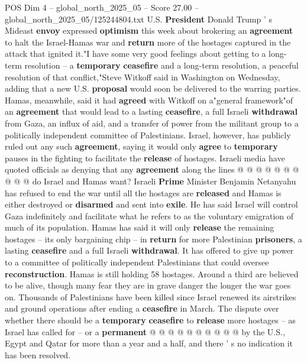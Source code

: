 \begin{textsample}{POS Dim 4 – global\_north\_2025\_05 – Score 27.00 – global\_north\_2025\_05/125244804.txt}  \label{ex:f4_pos_212}
U.S. \textbf{President} Donald Trump ' s Mideast \textbf{envoy} expressed \textbf{optimism} this week about brokering an \textbf{agreement} to halt the Israel-Hamas war and \textbf{return} more of the hostages captured in the attack that ignited it."I have some very good feelings about getting to a long-term resolution -- a \textbf{temporary} \textbf{ceasefire} and a long-term resolution, a peaceful resolution of that conflict,"Steve Witkoff said in Washington on Wednesday, adding that a new U.S. \textbf{proposal} would soon be delivered to the warring parties.
Hamas, meanwhile, said it had \textbf{agreed} with Witkoff on a"general framework"of an \textbf{agreement} that would lead to a lasting \textbf{ceasefire}, a full Israeli \textbf{withdrawal} from Gaza, an influx of aid, and a transfer of power from the militant group to a politically independent committee of Palestinians.
Israel, however, has publicly ruled out any such \textbf{agreement}, saying it would only \textbf{agree} to \textbf{temporary} pauses in the fighting to facilitate the \textbf{release} of hostages.
Israeli media have quoted officials as denying that any \textbf{agreement} along the lines @ @ @ @ @ @ @ @ @ @ do Israel and Hamas want?
Israeli \textbf{Prime} Minister Benjamin Netanyahu has refused to end the war until all the hostages are \textbf{released} and Hamas is either destroyed or \textbf{disarmed} and sent into \textbf{exile}.
He has said Israel will control Gaza indefinitely and facilitate what he refers to as the voluntary emigration of much of its population.
Hamas has said it will only \textbf{release} the remaining hostages -- its only bargaining chip -- in \textbf{return} for more Palestinian \textbf{prisoners}, a lasting \textbf{ceasefire} and a full Israeli \textbf{withdrawal}.
It has offered to give up power to a committee of politically independent Palestinians that could oversee \textbf{reconstruction}.
Hamas is still holding 58 hostages.
Around a third are believed to be alive, though many fear they are in grave danger the longer the war goes on.
Thousands of Palestinians have been killed since Israel renewed its airstrikes and ground operations after ending a \textbf{ceasefire} in March.
The dispute over whether there should be a \textbf{temporary} \textbf{ceasefire} to \textbf{release} more hostages -- as Israel has called for -- or a \textbf{permanent} @ @ @ @ @ @ @ @ @ @ by the U.S., Egypt and Qatar for more than a year and a half, and there ' s no indication it has been resolved.

\end{textsample}
